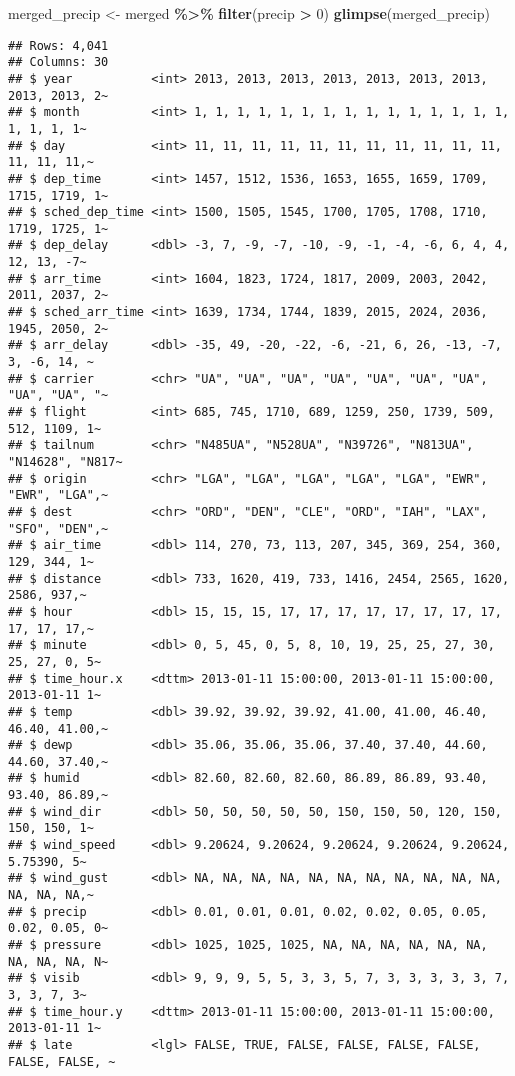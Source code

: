 \documentclass[
]{article}
\newenvironment{Shaded}{\begin{snugshade}}{\end{snugshade}}
\newcommand{\DecValTok}[1]{\textcolor[rgb]{0.00,0.00,0.81}{#1}}
\newcommand{\FunctionTok}[1]{\textcolor[rgb]{0.13,0.29,0.53}{\textbf{#1}}}
\newcommand{\NormalTok}[1]{#1}
\newcommand{\OtherTok}[1]{\textcolor[rgb]{0.56,0.35,0.01}{#1}}
\newcommand{\SpecialCharTok}[1]{\textcolor[rgb]{0.81,0.36,0.00}{\textbf{#1}}}
\begin{document}
\begin{Shaded}
\begin{Highlighting}[]
\NormalTok{merged\_precip }\OtherTok{\textless{}{-}}\NormalTok{ merged }\SpecialCharTok{\%\textgreater{}\%}
  \FunctionTok{filter}\NormalTok{(precip }\SpecialCharTok{\textgreater{}} \DecValTok{0}\NormalTok{)}
\FunctionTok{glimpse}\NormalTok{(merged\_precip)}
\end{Highlighting}
\end{Shaded}

\begin{verbatim}
## Rows: 4,041
## Columns: 30
## $ year           <int> 2013, 2013, 2013, 2013, 2013, 2013, 2013, 2013, 2013, 2~
## $ month          <int> 1, 1, 1, 1, 1, 1, 1, 1, 1, 1, 1, 1, 1, 1, 1, 1, 1, 1, 1~
## $ day            <int> 11, 11, 11, 11, 11, 11, 11, 11, 11, 11, 11, 11, 11, 11,~
## $ dep_time       <int> 1457, 1512, 1536, 1653, 1655, 1659, 1709, 1715, 1719, 1~
## $ sched_dep_time <int> 1500, 1505, 1545, 1700, 1705, 1708, 1710, 1719, 1725, 1~
## $ dep_delay      <dbl> -3, 7, -9, -7, -10, -9, -1, -4, -6, 6, 4, 4, 12, 13, -7~
## $ arr_time       <int> 1604, 1823, 1724, 1817, 2009, 2003, 2042, 2011, 2037, 2~
## $ sched_arr_time <int> 1639, 1734, 1744, 1839, 2015, 2024, 2036, 1945, 2050, 2~
## $ arr_delay      <dbl> -35, 49, -20, -22, -6, -21, 6, 26, -13, -7, 3, -6, 14, ~
## $ carrier        <chr> "UA", "UA", "UA", "UA", "UA", "UA", "UA", "UA", "UA", "~
## $ flight         <int> 685, 745, 1710, 689, 1259, 250, 1739, 509, 512, 1109, 1~
## $ tailnum        <chr> "N485UA", "N528UA", "N39726", "N813UA", "N14628", "N817~
## $ origin         <chr> "LGA", "LGA", "LGA", "LGA", "LGA", "EWR", "EWR", "LGA",~
## $ dest           <chr> "ORD", "DEN", "CLE", "ORD", "IAH", "LAX", "SFO", "DEN",~
## $ air_time       <dbl> 114, 270, 73, 113, 207, 345, 369, 254, 360, 129, 344, 1~
## $ distance       <dbl> 733, 1620, 419, 733, 1416, 2454, 2565, 1620, 2586, 937,~
## $ hour           <dbl> 15, 15, 15, 17, 17, 17, 17, 17, 17, 17, 17, 17, 17, 17,~
## $ minute         <dbl> 0, 5, 45, 0, 5, 8, 10, 19, 25, 25, 27, 30, 25, 27, 0, 5~
## $ time_hour.x    <dttm> 2013-01-11 15:00:00, 2013-01-11 15:00:00, 2013-01-11 1~
## $ temp           <dbl> 39.92, 39.92, 39.92, 41.00, 41.00, 46.40, 46.40, 41.00,~
## $ dewp           <dbl> 35.06, 35.06, 35.06, 37.40, 37.40, 44.60, 44.60, 37.40,~
## $ humid          <dbl> 82.60, 82.60, 82.60, 86.89, 86.89, 93.40, 93.40, 86.89,~
## $ wind_dir       <dbl> 50, 50, 50, 50, 50, 150, 150, 50, 120, 150, 150, 150, 1~
## $ wind_speed     <dbl> 9.20624, 9.20624, 9.20624, 9.20624, 9.20624, 5.75390, 5~
## $ wind_gust      <dbl> NA, NA, NA, NA, NA, NA, NA, NA, NA, NA, NA, NA, NA, NA,~
## $ precip         <dbl> 0.01, 0.01, 0.01, 0.02, 0.02, 0.05, 0.05, 0.02, 0.05, 0~
## $ pressure       <dbl> 1025, 1025, 1025, NA, NA, NA, NA, NA, NA, NA, NA, NA, N~
## $ visib          <dbl> 9, 9, 9, 5, 5, 3, 3, 5, 7, 3, 3, 3, 3, 3, 7, 3, 3, 7, 3~
## $ time_hour.y    <dttm> 2013-01-11 15:00:00, 2013-01-11 15:00:00, 2013-01-11 1~
## $ late           <lgl> FALSE, TRUE, FALSE, FALSE, FALSE, FALSE, FALSE, FALSE, ~
\end{verbatim}
\end{document}
